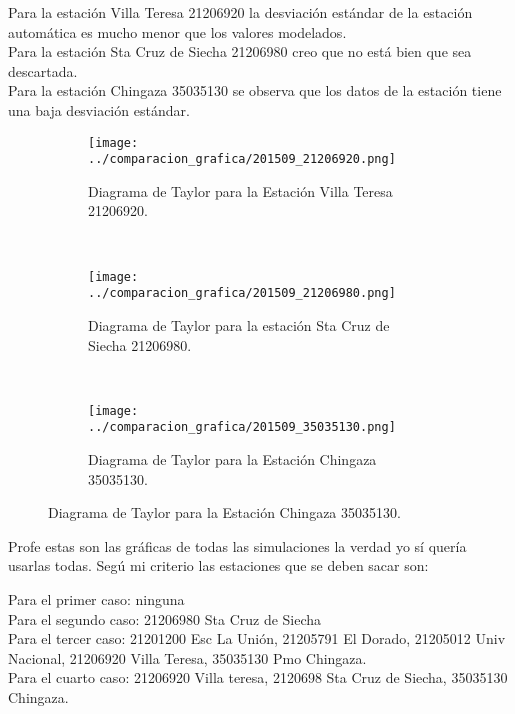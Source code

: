 Para la estación Villa Teresa 21206920 la desviación estándar de la estación automática es mucho menor que los valores modelados.\\

Para la estación Sta Cruz de Siecha 21206980 creo que no está bien que sea descartada.\\

Para la estación Chingaza 35035130 se observa que los datos de la estación tiene una baja desviación estándar.\\



\begin{figure}[H]
\begin{subfigure}[normla]{0.5\textwidth}
\caption{Diagrama de Taylor para la Estación Villa Teresa 21206920.}
\texttt{[image: ../comparacion\_grafica/201509\_21206920.png]}
\end{subfigure}
~
\begin{subfigure}[normla]{0.5\textwidth}
\caption{Diagrama de Taylor para la estación Sta Cruz de Siecha 21206980.}
\texttt{[image: ../comparacion\_grafica/201509\_21206980.png]}
\end{subfigure}
~
\begin{subfigure}[normla]{0.5\textwidth}
\caption{Diagrama de Taylor para la Estación Chingaza 35035130.}
\texttt{[image: ../comparacion\_grafica/201509\_35035130.png]}
\end{subfigure}

\end{figure}




Profe estas son las gráficas de todas las simulaciones la verdad yo sí quería usarlas todas. Segú mi criterio las estaciones que se deben sacar son:

Para el primer caso: ninguna\\
Para el segundo caso: 21206980 Sta Cruz de Siecha\\
Para el tercer caso: 21201200 Esc La Unión,  21205791 El Dorado, 21205012 Univ Nacional, 21206920 Villa Teresa, 35035130 Pmo Chingaza.\\
Para el cuarto caso: 21206920 Villa teresa, 2120698 Sta Cruz de Siecha, 35035130 Chingaza.

